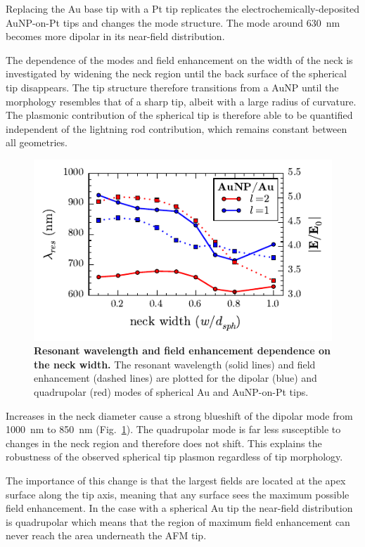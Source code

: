 \documentclass{article}
\begin{document}
Replacing the Au base tip with a Pt tip replicates the electrochemically-deposited AuNP-on-Pt tips and changes the mode structure. The mode around \SI{630}{nm} becomes more dipolar in its near-field distribution.

The dependence of the modes and field enhancement on the width of the neck is investigated by widening the neck region until the back surface of the spherical tip disappears. The tip structure therefore transitions from a AuNP until the morphology resembles that of a sharp tip, albeit with a large radius of curvature. The plasmonic contribution of the spherical tip is therefore able to be quantified independent of the lightning rod contribution, which remains constant between all geometries.

\begin{figure}[bt]
\centering
\includegraphics{figures/spherical_tip_neck_size_dependence}
\caption[Resonant wavelength and field enhancement dependence on the neck width]{\textbf{Resonant wavelength and field enhancement dependence on the neck width.} The resonant wavelength (solid lines) and field enhancement (dashed lines) are plotted for the dipolar (blue) and quadrupolar (red) modes of spherical Au and AuNP-on-Pt tips.}
\label{fig:neck_size_dependence}
\end{figure}

Increases in the neck diameter cause a strong blueshift of the dipolar mode from \SI{1000}{nm} to \SI{850}{nm} (Fig.~\ref{fig:neck_size_dependence}). The quadrupolar mode is far less susceptible to changes in the neck region and therefore does not shift. This explains the robustness of the observed spherical tip plasmon regardless of tip morphology.

The importance of this change is that the largest fields are located at the apex surface along the tip axis, meaning that any surface sees the maximum possible field enhancement. In the case with a spherical Au tip the near-field distribution is quadrupolar which means that the region of maximum field enhancement can never reach the area underneath the AFM tip.
\end{document}
